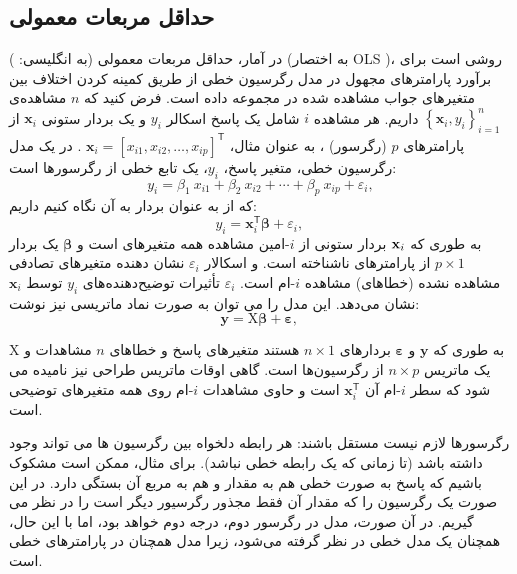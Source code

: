 \documentclass[12pt,a4paper,BCOR=.7cm,headsepline,bibliography=totoc]{report}
\begin{document}
\subsection{حداقل مربعات معمولی}
در آمار، حداقل مربعات معمولی (به انگلیسی: ) (به اختصار OLS )، روشی است برای برآورد پارامترهای مجهول در مدل رگرسیون خطی از طریق کمینه کردن اختلاف بین متغیرهای جواب مشاهده شده در مجموعه داده است. فرض کنید که $n$ مشاهده‌ی
 $\left\{\mathbf {x} _{i},y_{i}\right\}_{i=1}^{n}$
 داریم.
هر مشاهده $i$ شامل یک پاسخ اسکالر $y_{i}$ و یک بردار ستونی $\mathbf {x}_{i}$ از پارامترهای $p$ (رگرسور) ، به عنوان مثال، 
$\mathbf {x}_{i}=\left[x_{i1},x_{i2},\dots ,x_{ip}\right]^{\mathsf { T}}$
. در یک مدل رگرسیون خطی، متغیر پاسخ، $y_{i}$، یک تابع خطی از رگرسورها است:
$${\displaystyle y_{i}=\beta _{1}\ x_{i1}+\beta _{2}\ x_{i2}+\cdots +\beta _{p}\ x_{ip}+\varepsilon _{i},}$$
که از به عنوان بردار به آن نگاه کنیم داریم:
$$
{\displaystyle y_{i}=\mathbf {x} _{i}^{\mathsf {T}}{\boldsymbol {\beta }}+\varepsilon _{i},\,}
$$
به طوری که ${\displaystyle}\mathbf {x} _{i}$ بردار ستونی از
 ${\displaystyle i}$-امین مشاهده همه متغیرهای است و
 ${\displaystyle\boldsymbol {\beta}}$	
 یک بردار ${\displaystyle p\times 1}$ از پارامترهای ناشناخته است. و اسکالار
 ${\displaystyle \varepsilon _{i}}$
 نشان دهنده متغیرهای تصادفی مشاهده نشده (خطاهای) مشاهده 
${\displaystyle i}$-ام است.
${\displaystyle \varepsilon _{i}}$
 تأثیرات توضیح‌دهنده‌های
 ${\displaystyle y_{i}}$ 
توسط
${\displaystyle \mathbf {x} _ {i}}$
نشان می‌دهد.
 این مدل را می توان به صورت نماد ماتریسی نیز نوشت:
$$
{\displaystyle \mathbf {y} =\mathrm {X} {\boldsymbol {\beta }}+{\boldsymbol {\varepsilon }},\,}
$$

به طوری که ${\displaystyle \mathbf {y} }$ و ${\displaystyle {\boldsymbol {\varepsilon}}}$ بردارهای
 ${\displaystyle n\times 1}$ هستند متغیرهای پاسخ و خطاهای ${\displaystyle n}$ مشاهدات و ${\displaystyle \mathrm {X} }$ یک ماتریس ${\displaystyle n\times p}$ از رگرسیون‌ها است. گاهی اوقات ماتریس طراحی نیز نامیده می شود که سطر ${\displaystyle i}$-ام آن $ {\displaystyle \mathbf {x} _{i}^{\mathsf {T}}}$ است و حاوی مشاهدات ${\displaystyle i}$-ام روی همه متغیرهای توضیحی است.

رگرسورها لازم نیست مستقل باشند: هر رابطه دلخواه بین رگرسیون ها می تواند وجود داشته باشد (تا زمانی که یک رابطه خطی نباشد). برای مثال، ممکن است مشکوک باشیم که پاسخ به صورت خطی هم به مقدار و هم به مربع آن بستگی دارد. در این صورت یک رگرسیون را که مقدار آن فقط مجذور رگرسیور دیگر است را در نظر می گیریم. در آن صورت، مدل در رگرسور دوم، درجه دوم خواهد بود، اما با این حال، همچنان یک مدل خطی در نظر گرفته می‌شود، زیرا مدل همچنان در پارامترهای خطی است.
\end{document}
